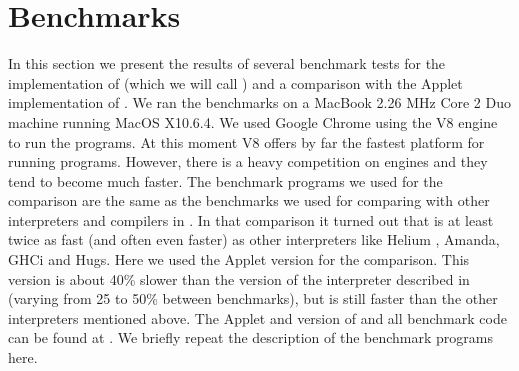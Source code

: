 \section{Benchmarks} \label{sapljs:sec:benchmarks}
In this section we present the results of several benchmark tests for the  \JavaScript implementation of \Sapl (which we will call \Sapljs) and a
comparison with the \Java Applet implementation of \Sapl. 
We ran the benchmarks on a MacBook 2.26 MHz Core 2 Duo machine running MacOS X10.6.4.
We used Google Chrome using the V8 \JavaScript engine to run the programs.
At this moment V8 offers by far the fastest platform for running \Sapljs programs.
However, there is a heavy competition on \JavaScript engines and they tend to become much faster.
The benchmark programs we used for the comparison are the same as the benchmarks  we used for comparing 
\Sapl with other interpreters and compilers in \cite{JKP}. In that comparison it turned out that \Sapl is at least twice as fast (and often even faster)
as other interpreters like \textsf{Helium} , \textsf{Amanda}, \textsf{GHCi} and \textsf{Hugs}.
Here we used the \Java Applet version for the comparison. This version is about 40\% slower than the \C  version
of the interpreter described in \cite{JKP} (varying from 25 to 50\% between benchmarks), but is still faster than the other interpreters mentioned above.
The \Java Applet and \JavaScript  version of  \Sapl  and all benchmark code can be found at \cite{SAPL}.
We briefly repeat the description of the benchmark programs here.

